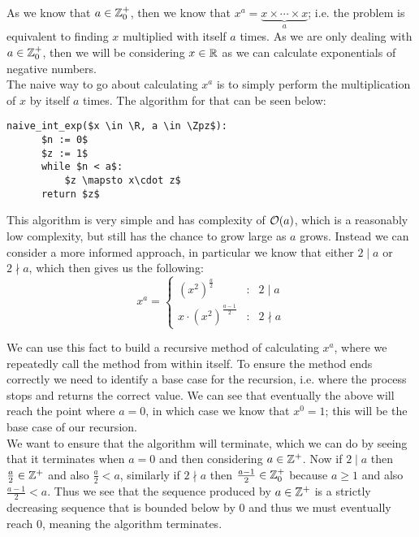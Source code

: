 As we know that \(a \in \mathbb{Z}^+_0\), then we know that \(x^a = \underbrace{x\times \cdots \times x}_a\); i.e. the problem is equivalent to finding \(x\) multiplied with itself \(a\) times. As we are only dealing with \(a \in \mathbb{Z}^+_0\), then we will be considering \(x \in \mathbb{R}\) as we can calculate exponentials of negative numbers.\\

The naive way to go about calculating \(x^a\) is to simply perform the multiplication of \(x\) by itself \(a\) times. The algorithm for that can be seen below:

\begin{lstlisting}[caption={Naive integer exponentiation},label={PCD_"Naive int exp"}]
  naive_int_exp($x \in \R, a \in \Zpz$):
      $n := 0$
      $z := 1$
      while $n < a$:
          $z \mapsto x\cdot z$
      return $z$
\end{lstlisting}

This algorithm is very simple and has complexity of \(\mathcal{O}(a)\), which is a reasonably low complexity, but still has the chance to grow large as \(a\) grows. Instead we can consider a more informed approach, in particular we know that either \(2 \mid a\) or \(2 \nmid a\), which then gives us the following:
\:
\begin{displaymath}
	x^a = \left\{\begin{array}{lcl}
		(x^2)^{\tfrac{a}{2}} & : & 2 \mid a\\
		x \cdot (x^2)^{\tfrac{a-1}{2}} & : & 2 \nmid a
	\end{array}\right.
\end{displaymath}

We can use this fact to build a recursive method of calculating \(x^a\), where we repeatedly call the method from within itself. To ensure the method ends correctly we need to identify a base case for the recursion, i.e. where the process stops and returns the correct value. We can see that eventually the above will reach the point where \(a = 0\), in which case we know that \(x^0 = 1\); this will be the base case of our recursion.\\

We want to ensure that the algorithm will terminate, which we can do by seeing that it terminates when \(a = 0\) and then considering \(a \in \mathbb{Z}^+\). Now if \(2 \mid a\) then \(\tfrac{a}{2} \in \mathbb{Z}^+\) and also \(\tfrac{a}{2} < a\), similarly if \(2 \nmid a\) then \(\tfrac{a-1}{2} \in \mathbb{Z}^+_0\) because \(a \ge 1\) and also \(\tfrac{a-1}{2} < a\). Thus we see that the sequence produced by \(a \in \mathbb{Z}^+\) is a strictly decreasing sequence that is bounded below by 0 and thus we must eventually reach 0, meaning the algorithm terminates.\\

